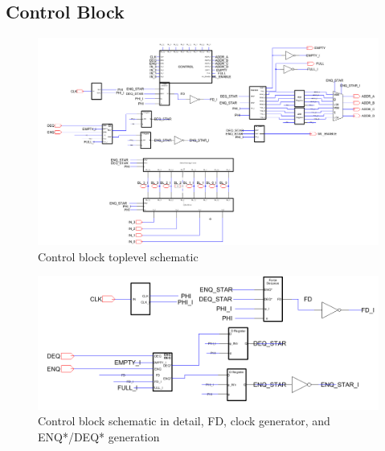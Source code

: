 \documentclass[12pt]{report}
\begin{document}
\subsection*{Control Block}
\begin{figure}[H]
  \centering
    \includegraphics[width=1.0\textwidth]{Schematics/control_block_schematic.PNG}
  \caption{Control block toplevel schematic}
  \label{fig:control_block_schematic}
\end{figure}
\begin{figure}[H]
  \centering
    \includegraphics[width=1.0\textwidth]{Schematics/control_block_fd_clockgen_enqstar_deqstar_schematic.PNG}
  \caption{Control block schematic in detail, FD, clock generator, and ENQ*/DEQ* generation}
  \label{fig:control_block_fd_clockgen_enqstar_deqstar_schematic}
\end{figure}
\end{document}
